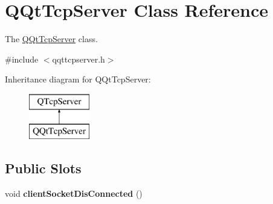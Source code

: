 \hypertarget{class_q_qt_tcp_server}{}\section{Q\+Qt\+Tcp\+Server Class Reference}
\label{class_q_qt_tcp_server}


The \mbox{\hyperlink{class_q_qt_tcp_server}{Q\+Qt\+Tcp\+Server}} class.  




{\ttfamily \#include $<$qqttcpserver.\+h$>$}

Inheritance diagram for Q\+Qt\+Tcp\+Server\+:\begin{figure}[H]
\begin{center}
\leavevmode
\includegraphics[height=2.000000cm]{class_q_qt_tcp_server}
\end{center}
\end{figure}
\subsection*{Public Slots}
\begin{DoxyCompactItemize}
\item 
\mbox{\label{class_q_qt_tcp_server_ab71e6723c44112399fcbed188e7b1d0a}} 
void {\bfseries client\+Socket\+Dis\+Connected} ()
\end{DoxyCompactItemize}
